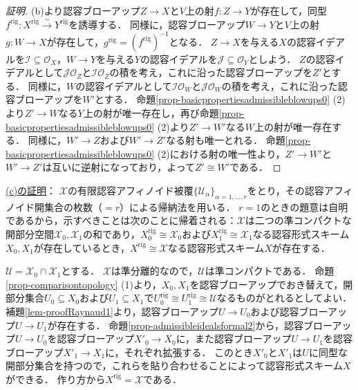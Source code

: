 \documentclass[a4paper,12pt, dvipdfmx]{jsbook}
\def\O{\mathscr{O}}
\def\rig{\mathop{\mathrm{rig}}\nolimits}
\theoremstyle{plain}
\theoremstyle{definition}
\begin{document}
\begin{proof}[証明]
(b)より認容ブローアップ$Z\rightarrow X$と$V$上の射$f\colon Z\rightarrow Y$が存在して，同型$f^{\rig}\colon X^{\rig}\stackrel{\sim}{\rightarrow}Y^{\rig}$を誘導する．
同様に，認容ブローアップ$W\rightarrow Y$と$V$上の射$g\colon W\rightarrow X$が存在して，$g^{\rig}=(f^{\rig})^{-1}$となる．
$Z\rightarrow X$を与える$X$の認容イデアルを$\mathscr{I}\subseteq\O_X$，$W\rightarrow Y$を与える$Y$の認容イデアルを$\mathscr{J}\subseteq\O_Y$としよう．
$Z$の認容イデアルとして$\mathscr{J}\O_Z$と$\mathscr{I}\O_Z$の積を考え，これに沿った認容ブローアップを$Z'$とする．
同様に，$W$の認容イデアルとして$\mathscr{I}\O_W$と$\mathscr{J}\O_W$の積を考え，これに沿った認容ブローアップを$W'$とする．
命題\ref{prop-basicpropertiesadmissibleblowups0} (2)より$Z'\rightarrow W$なる$Y$上の射が唯一存在し，再び命題\ref{prop-basicpropertiesadmissibleblowups0} (2)より$Z'\rightarrow W'$なる$W$上の射が唯一存在する．
同様に，$W'\rightarrow Z$および$W'\rightarrow Z'$なる射も唯一とれる．
命題\ref{prop-basicpropertiesadmissibleblowups0} (2)における射の唯一性より，$Z'\rightarrow W'$と$W'\rightarrow Z'$は互いに逆射になっており，よって$Z'\cong W'$である．
\end{proof}

\medskip\noindent
\underline{(c)の証明}：
$\mathcal{X}$の有限認容アフィノイド被覆$\{\mathcal{U}_{\alpha}\}_{\alpha=1,\ldots,r}$をとり，その認容アフィノイド開集合の枚数（$=r$）による帰納法を用いる．
$r=1$のときの題意は自明であるから，示すべきことは次のことに帰着される：$\mathcal{X}$は二つの準コンパクトな開部分空間$\mathcal{X}_0,\mathcal{X}_1$の和であり，$X^{\rig}_0\cong\mathcal{X}_0$および$X^{\rig}_1\cong\mathcal{X}_1$なる認容形式スキーム$X_0,X_1$が存在しているとき，$X^{\rig}\cong\mathcal{X}$なる認容形式スキーム$X$が存在する．

$\mathcal{U}=\mathcal{X}_0\cap\mathcal{X}_1$とする．
$\mathcal{X}$は準分離的なので，$\mathcal{U}$は準コンパクトである．
命題\ref{prop-comparisontopology} (1)より，$X_0,X_1$を認容ブローアップでおき替えて，開部分集合$U_0\subseteq X_0$および$U_1\subseteq X_1$で$U^{\rig}_0\cong U^{\rig}_1\cong\mathcal{U}$なるものがとれるとしてよい．
補題\ref{lem-proofRaynaud1}より，認容ブローアップ$U\rightarrow U_0$および認容ブローアップ$U\rightarrow U_1$が存在する．
命題\ref{prop-admissibleidealsformal2}から，認容ブローアップ$U\rightarrow U_0$を認容ブローアップ$X'_0\rightarrow X_0$に，また認容ブローアップ$U\rightarrow U_1$を認容ブローアップ$X'_1\rightarrow X_1$に，それぞれ拡張する．
このとき$X'_0$と$X'_1$は$U$に同型な開部分集合を持つので，これらを貼り合わせることによって認容形式スキーム$X$ができる．
作り方から$X^{\rig}=\mathcal{X}$である．
\end{document}
